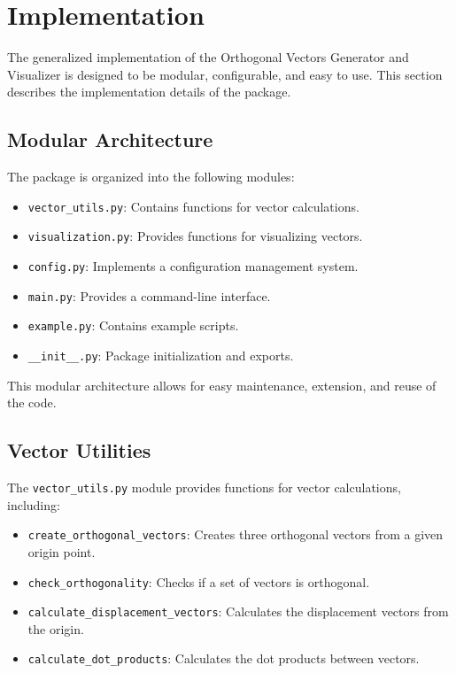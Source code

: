 \section{Implementation}

The generalized implementation of the Orthogonal Vectors Generator and Visualizer is designed to be modular, configurable, and easy to use. This section describes the implementation details of the package.

\subsection{Modular Architecture}

The package is organized into the following modules:

\begin{itemize}
    \item \texttt{vector\_utils.py}: Contains functions for vector calculations.
    \item \texttt{visualization.py}: Provides functions for visualizing vectors.
    \item \texttt{config.py}: Implements a configuration management system.
    \item \texttt{main.py}: Provides a command-line interface.
    \item \texttt{example.py}: Contains example scripts.
    \item \texttt{\_\_init\_\_.py}: Package initialization and exports.
\end{itemize}

This modular architecture allows for easy maintenance, extension, and reuse of the code.

\subsection{Vector Utilities}

The \texttt{vector\_utils.py} module provides functions for vector calculations, including:

\begin{itemize}
    \item \texttt{create\_orthogonal\_vectors}: Creates three orthogonal vectors from a given origin point.
    \item \texttt{check\_orthogonality}: Checks if a set of vectors is orthogonal.
    \item \texttt{calculate\_displacement\_vectors}: Calculates the displacement vectors from the origin.
    \item \texttt{calculate\_dot\_products}: Calculates the dot products between vectors.
\end{itemize}

